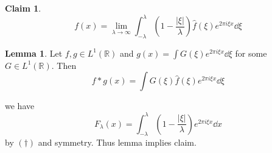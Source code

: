 \documentclass{article}
\theoremstyle{definition}
\newtheorem{lem}{Lemma}
\newtheorem*{clm}{Claim}
\newcommand{\RR}{\mathbb R}
\begin{document}
\begin{clm}
	\[
		f(x) = \lim_{\lambda \to \infty} \int_{-\lambda}^\lambda \left( 1 - \frac{|\xi|}{\lambda} \right) \widehat{f}(\xi) e^{2 \pi i \xi x} \dd{\xi}
	\]
\end{clm}

\begin{lem}
	Let $f, g \in L^1(\RR)$ and $g(x) = \int G(\xi) e^{2 \pi i \xi x} \dd{\xi}$ for some $G \in L^1(\RR)$.
	Then 
	\[
		f * g(x) = \int G(\xi) \widehat{f}(\xi) e^{2 \pi i \xi x} \dd{\xi}
	\]
\end{lem}

we have
\[
	F_\lambda(x) = \int_{- \lambda}^\lambda \left(1 - \frac{|\xi|}{\lambda} \right) e^{2 \pi i \xi x} \dd{x}
\]
by $(\dagger)$ and symmetry.
Thus lemma implies claim.
\end{document}
